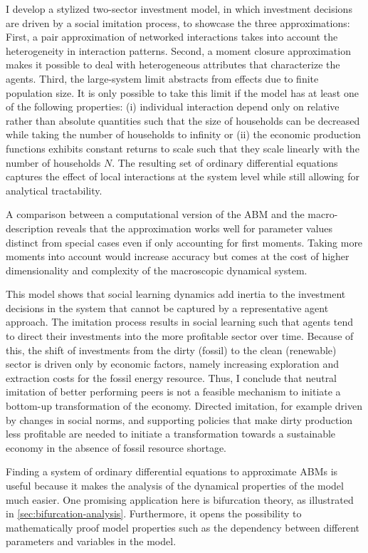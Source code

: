 I develop a stylized two-sector investment model, in which investment decisions are driven by a social imitation process, to showcase the three approximations:
First, a pair approximation of networked interactions takes into account the heterogeneity in interaction patterns.
Second, a moment closure approximation makes it possible to deal with heterogeneous attributes that characterize the agents.
Third, the large-system limit abstracts from effects due to finite population size.
It is only possible to take this limit if the model has at least one of the following properties: (i) individual interaction depend only on relative rather than absolute quantities such that the size of households can be decreased while taking the number of households to infinity or (ii) the economic production functions exhibits constant returns to scale such that they scale linearly with the number of households $N$.
The resulting set of ordinary differential equations captures the effect of local interactions at the system level while still allowing for analytical tractability.

A comparison between a computational version of the ABM and the macro-description reveals that the approximation works well for parameter values distinct from special cases even if only accounting for first moments. Taking more moments into account would increase accuracy but comes at the cost of higher dimensionality and complexity of the macroscopic dynamical system.

This model shows that social learning dynamics add inertia to the investment decisions in the system that cannot be captured by a representative agent approach.
The imitation process results in social learning such that agents tend to direct their investments into the more profitable sector over time.
Because of this, the shift of investments from the dirty (fossil) to the clean (renewable) sector is driven only by economic factors, namely increasing exploration and extraction costs for the fossil energy resource.
Thus, I conclude that neutral imitation of better performing peers is not a feasible mechanism to initiate a bottom-up transformation of the economy. Directed imitation, for example driven by changes in social norms, and supporting policies that make dirty production less profitable are needed to initiate a transformation towards a sustainable economy in the absence of fossil resource shortage.

Finding a system of ordinary differential equations to approximate ABMs is useful because it makes the analysis of the dynamical properties of the model much easier. One promising application here is bifurcation theory, as illustrated in \cref{sec:bifurcation-analysis}.
Furthermore, it opens the possibility to mathematically proof model properties such as the dependency between different parameters and variables in the model.

